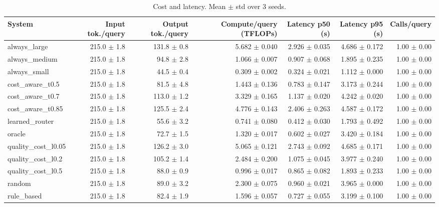 \begin{table}[t]
\centering
\small
\caption{Cost and latency. Mean $\pm$ std over 3 seeds.}
\label{tab:efficiency}
\begin{tabular}{lrrrrrr}
\toprule
System & Input tok./query & Output tok./query & Compute/query (TFLOPs) & Latency p50 (s) & Latency p95 (s) & Calls/query \\
\midrule
always\_large & 215.0 $\pm$ 1.8 & 131.8 $\pm$ 0.8 & 5.682 $\pm$ 0.040 & 2.926 $\pm$ 0.035 & 4.686 $\pm$ 0.172 & 1.00 $\pm$ 0.00 \\
always\_medium & 215.0 $\pm$ 1.8 & 94.8 $\pm$ 2.8 & 1.066 $\pm$ 0.007 & 0.907 $\pm$ 0.068 & 1.895 $\pm$ 0.235 & 1.00 $\pm$ 0.00 \\
always\_small & 215.0 $\pm$ 1.8 & 44.5 $\pm$ 0.4 & 0.309 $\pm$ 0.002 & 0.324 $\pm$ 0.021 & 1.112 $\pm$ 0.000 & 1.00 $\pm$ 0.00 \\
cost\_aware\_t0.5 & 215.0 $\pm$ 1.8 & 81.5 $\pm$ 4.8 & 1.443 $\pm$ 0.136 & 0.783 $\pm$ 0.147 & 3.173 $\pm$ 0.244 & 1.00 $\pm$ 0.00 \\
cost\_aware\_t0.7 & 215.0 $\pm$ 1.8 & 113.0 $\pm$ 1.2 & 3.329 $\pm$ 0.165 & 1.137 $\pm$ 0.020 & 4.242 $\pm$ 0.020 & 1.00 $\pm$ 0.00 \\
cost\_aware\_t0.85 & 215.0 $\pm$ 1.8 & 125.5 $\pm$ 2.4 & 4.776 $\pm$ 0.143 & 2.406 $\pm$ 0.263 & 4.587 $\pm$ 0.172 & 1.00 $\pm$ 0.00 \\
learned\_router & 215.0 $\pm$ 1.8 & 55.6 $\pm$ 3.2 & 0.741 $\pm$ 0.080 & 0.412 $\pm$ 0.030 & 1.793 $\pm$ 0.492 & 1.00 $\pm$ 0.00 \\
oracle & 215.0 $\pm$ 1.8 & 72.7 $\pm$ 1.5 & 1.320 $\pm$ 0.017 & 0.602 $\pm$ 0.027 & 3.420 $\pm$ 0.184 & 1.00 $\pm$ 0.00 \\
quality\_cost\_l0.05 & 215.0 $\pm$ 1.8 & 126.2 $\pm$ 3.0 & 5.065 $\pm$ 0.121 & 2.743 $\pm$ 0.092 & 4.685 $\pm$ 0.171 & 1.00 $\pm$ 0.00 \\
quality\_cost\_l0.2 & 215.0 $\pm$ 1.8 & 105.2 $\pm$ 1.4 & 2.484 $\pm$ 0.200 & 1.075 $\pm$ 0.045 & 3.977 $\pm$ 0.240 & 1.00 $\pm$ 0.00 \\
quality\_cost\_l0.5 & 215.0 $\pm$ 1.8 & 88.0 $\pm$ 0.9 & 0.996 $\pm$ 0.017 & 0.865 $\pm$ 0.082 & 1.893 $\pm$ 0.233 & 1.00 $\pm$ 0.00 \\
random & 215.0 $\pm$ 1.8 & 89.0 $\pm$ 3.2 & 2.300 $\pm$ 0.075 & 0.960 $\pm$ 0.021 & 3.965 $\pm$ 0.000 & 1.00 $\pm$ 0.00 \\
rule\_based & 215.0 $\pm$ 1.8 & 82.4 $\pm$ 1.9 & 1.596 $\pm$ 0.057 & 0.727 $\pm$ 0.055 & 3.199 $\pm$ 0.100 & 1.00 $\pm$ 0.00 \\

\end{tabular}
\end{table}
